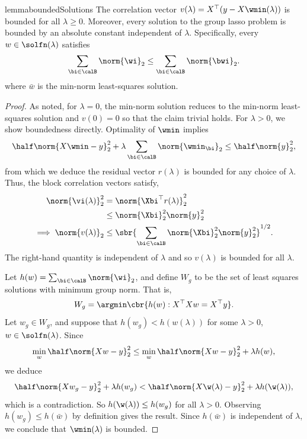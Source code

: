 \begin{restatable}{lemma}{boundedSolutions}\label{lemma:bounded-solutions}
	The correlation vector \( v(\lambda) = X^\top (y -  X\wmin(\lambda)) \) is bounded
	for all \( \lambda \geq 0 \).
	Moreover, every solution to the group lasso problem
	is bounded by an absolute constant independent of \( \lambda \).
	Specifically, every \( w \in \solfn(\lambda) \) satisfies
	\[
		\sum_{\bi \in \calB} \norm{\wi}_2 \leq \sum_{\bi \in \calB} \norm{\bwi}_2.
	\]
	where \( \bar w \) is the min-norm least-squares solution.
\end{restatable}
\begin{proof}
	As noted, for \( \lambda = 0 \), the min-norm solution reduces to the min-norm least-squares
	solution and \( v(0) = 0 \) so that the claim trivial holds.
	For \( \lambda > 0 \), we show boundedness directly.
	Optimality of \( \wmin \) implies
	\[
		\half \norm{X \wmin - y}_2^2 + \lambda \sum_{\bi \in \calB} \norm{\wmin_\bi}_2
		\leq \half \norm{y}_2^2,
	\]
	from which we deduce the residual vector \( r(\lambda) \) is bounded
	for any choice of \( \lambda \).
	Thus, the block correlation vectors satisfy,
	\begin{align*}
		\norm{\vi(\lambda)}^2_2      & = \norm{\Xbi^\top r(\lambda)}_2^2                                   \\
		                             & \leq \norm{\Xbi}_2^2 \norm{y}_2^2                                   \\
		\implies \norm{v(\lambda)}_2 & \leq \sbr{\sum_{\bi \in \calB} \norm{\Xbi}^2_2 \norm{y}^2_2}^{1/2}.
	\end{align*}
	The right-hand quantity is independent of \( \lambda \) and
	so \( v(\lambda) \) is bounded for all \( \lambda \).

	Let \( h(w) = \sum_{\bi \in \calB} \norm{\wi}_2 \),
	and define \( W_{g} \) to be the set of least squares solutions with
	minimum group norm.
	That is,
	\[
		W_{g} = \argmin \cbr{h(w) : X^\top X w = X^\top y }.
	\]
	Let \( w_g \in W_g \),
	and suppose that \( h(w_{g}) < h(w(\lambda)) \)
	for some \( \lambda > 0 \), \( w \in \solfn(\lambda) \).
	Since
	\[
		\min_{w} \half \norm{X w - y}_2^2
		\leq \min_{w} \half \norm{X w - y}_2^2
		+ \lambda h(w),
	\]
	we deduce
	\[
		\half \norm{X w_g - y}_2^2 + \lambda h(w_g) <
		\half \norm{X \w(\lambda) - y}_2^2
		+ \lambda h(\w(\lambda)),
	\]
	which is a contradiction.
	So \( h(\w(\lambda)) \leq h(w_g) \) for all \( \lambda > 0 \).
	Observing \( h(w_g) \leq h(\bar w) \) by definition gives the result.
	Since \( h(\bar w) \) is independent of \( \lambda \),
	we conclude that \( \wmin(\lambda) \) is bounded.
\end{proof}


